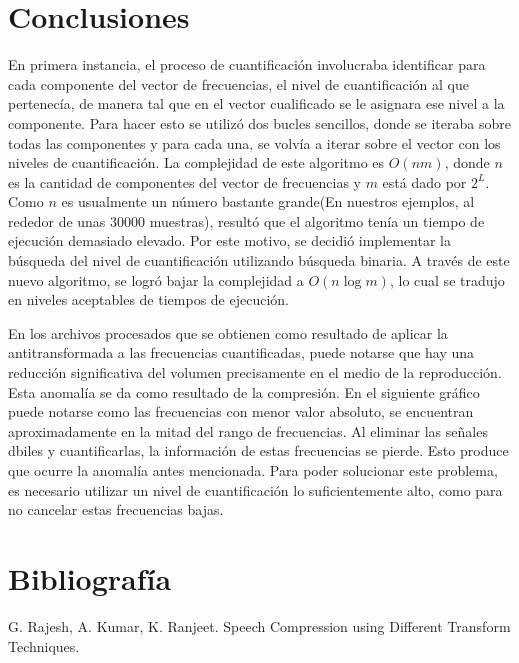 \documentclass[a4paper,11pt]{article}
\begin{document}
\section{Conclusiones}
En primera instancia, el proceso de cuantificación involucraba identificar para
cada componente del vector de frecuencias, el nivel de cuantificación al que
pertenecía, de manera tal que en el vector cualificado se le asignara ese nivel
a la componente. Para hacer esto se utilizó dos bucles sencillos, donde se
iteraba sobre todas las componentes y para cada una, se volvía a iterar sobre
el vector con los niveles de cuantificación. La complejidad de este algoritmo
es $O(nm)$, donde $n$ es la cantidad de componentes del vector de frecuencias y
$m$ está dado por $2^{L}$. Como $n$ es usualmente un número bastante grande(En
nuestros ejemplos, al rededor de unas 30000 muestras), resultó que el algoritmo
tenía un tiempo de ejecución demasiado elevado. Por este motivo, se decidió
implementar la búsqueda del nivel de cuantificación utilizando búsqueda
binaria. A través de este nuevo algoritmo, se logró bajar la complejidad a
$O(n\log m)$, lo cual se tradujo en niveles aceptables de tiempos de ejecución.

En los archivos procesados que se obtienen como resultado de aplicar la
antitransformada a las frecuencias cuantificadas, puede notarse que hay una
reducción significativa del volumen precisamente en el medio de la
reproducción. Esta anomalía se da como resultado de la compresión. En el
siguiente gráfico puede notarse como las frecuencias con menor valor absoluto,
se encuentran aproximadamente en la mitad del rango de frecuencias.
Al eliminar las señales dbiles y cuantificarlas, la información de estas
frecuencias se pierde. Esto produce que ocurre la anomalía antes mencionada.
Para poder solucionar este problema, es necesario utilizar un nivel de
cuantificación lo suficientemente alto, como para no cancelar estas frecuencias
bajas.
\newpage
\section{Bibliograf\'ia}
G. Rajesh, A. Kumar, K. Ranjeet. Speech Compression using Different Transform Techniques.
\end{document}

